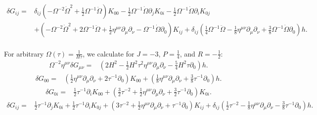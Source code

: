 \documentclass[10pt,letterpaper]{article}
\begin{document}
\begin{align}
\delta G_{ij}={}&\delta_{ij}(- \Omega^{-2} \dot{\Omega}^2
 + \tfrac{1}{2} \Omega^{-1} \ddot{\Omega}) K_{00}
- \tfrac{1}{2} \Omega^{-1} \dot{\Omega} \partial_{j} K_{0i}
 -  \tfrac{1}{2} \Omega^{-1} \dot{\Omega} \partial_{i} K_{0j}\nonumber \\
 &+ (- \Omega^{-2} \dot{\Omega}^2
 + 2 \Omega^{-1} \ddot{\Omega}
 + \tfrac{1}{2} \eta^{\mu \nu} \partial_{\mu} \partial_{\nu}
 -  \Omega^{-1} \dot{\Omega} \partial_{0}) K_{ij}
 + \delta_{ij}(\tfrac{1}{4} \Omega^{-1} \ddot{\Omega}
 -  \tfrac{1}{8} \eta^{\mu \nu} \partial_{\mu} \partial_{\nu}
 + \tfrac{3}{8} \Omega^{-1} \dot{\Omega} \partial_{0}) h.
\end{align}
\\
For arbitrary $\Omega(\tau)=\frac{1}{H\tau}$, we calculate for $J=-3$, $P=\tfrac14$, and $R=-\tfrac12$:
\begin{align}
\Omega^{-2}\eta^{\mu\nu}\delta G_{\mu\nu}={}&(2 H^2
 -  \tfrac{1}{2} H^2 \tau^2 \eta^{\mu \nu} \partial_{\mu} \partial_{\nu}
 -  \tfrac{5}{4} H^2 \tau \partial_{0}) h.
\end{align}
\begin{align}
\delta G_{00}={}&(\tfrac{1}{2} \eta^{\mu \nu} \partial_{\mu} \partial_{\nu}
 + 2 \tau^{-1} \partial_{0}) K_{00}
 + (\tfrac{1}{8} \eta^{\mu \nu} \partial_{\mu} \partial_{\nu}
 + \tfrac{3}{8} \tau^{-1} \partial_{0}) h.
\end{align}
\begin{align}
\delta G_{0i}={}&\tfrac{1}{2} \tau^{-1} \partial_{i} K_{00}
 + (\tfrac{3}{2} \tau^{-2}
 + \tfrac{1}{2} \eta^{\mu \nu} \partial_{\mu} \partial_{\nu}
 + \tfrac{3}{2} \tau^{-1} \partial_{0}) K_{0i}.
\end{align}
\begin{align}
\delta G_{ij}={}&\tfrac{1}{2} \tau^{-1} \partial_{j} K_{0i}
 + \tfrac{1}{2} \tau^{-1} \partial_{i} K_{0j}
 + (3 \tau^{-2}
 + \tfrac{1}{2} \eta^{\mu \nu} \partial_{\mu} \partial_{\nu}
 + \tau^{-1} \partial_{0}) K_{ij}
 +\delta_{ij} (\tfrac{1}{2} \tau^{-2}
 -  \tfrac{1}{8} \eta^{\mu \nu} \partial_{\mu} \partial_{\nu}
 -  \tfrac{3}{8} \tau^{-1} \partial_{0}) h.
\end{align}
\\
\end{document}
